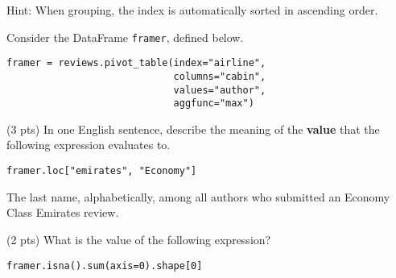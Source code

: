 \documentclass[twoside,12pt]{article}
\begin{document}
\begin{probset}
\begin{prob}[(9 pts)]
\begin{subprobset}
\begin{subprob}
\begin{tabular}{lll}

\end{tabular}

\small{Hint: When grouping, the index is automatically sorted in ascending order.}
    
\end{subprob}
    
\end{subprobset}
    
\end{prob}

\newpage

\begin{prob}[(8 pts)]

Consider the DataFrame \texttt{framer}, defined below.
\begin{verbatim}
framer = reviews.pivot_table(index="airline",
                             columns="cabin",
                             values="author",
                             aggfunc="max")
\end{verbatim}

\begin{subprobset}

\begin{subprob}(3 pts) In one English sentence, describe the meaning of the \textbf{value} that the following expression evaluates to.

\begin{verbatim}
framer.loc["emirates", "Economy"]
\end{verbatim}

\begin{responsebox}{1in}
The last name, alphabetically, among all authors who submitted an Economy Class Emirates review.
\end{responsebox}
    
\end{subprob}

\begin{subprob}(2 pts) What is the value of the following expression?

\begin{verbatim}
framer.isna().sum(axis=0).shape[0]
\end{verbatim}



\end{subprob}
\end{subprobset}
\end{prob}
\end{probset}
\end{document}
